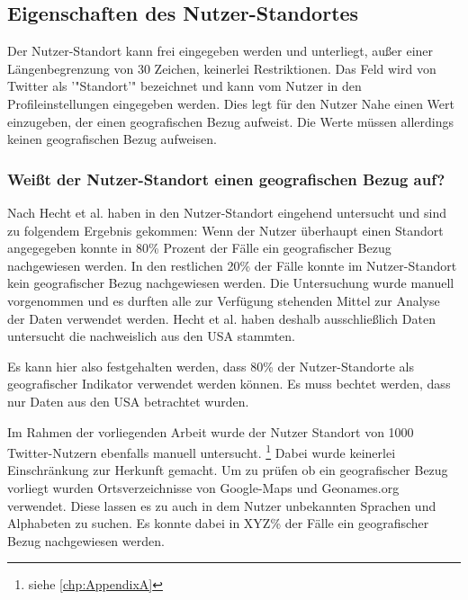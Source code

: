 			\subsection{Eigenschaften des Nutzer-Standortes} 

				Der Nutzer-Standort kann frei eingegeben werden und unterliegt, außer einer Längenbegrenzung von 30 Zeichen, keinerlei Restriktionen. 
				Das Feld wird von Twitter als '"Standort'" bezeichnet und kann vom Nutzer in den Profileinstellungen eingegeben werden. 
				Dies legt für den Nutzer Nahe einen Wert einzugeben, der einen geografischen Bezug aufweist.
				Die Werte müssen allerdings keinen geografischen Bezug aufweisen.

				\subsubsection{Weißt der Nutzer-Standort einen geografischen Bezug auf?} 
					
					Nach Hecht et al. haben in \cite{Hecht2011} den Nutzer-Standort eingehend untersucht und sind zu folgendem Ergebnis gekommen:
					Wenn der Nutzer überhaupt einen Standort angegegeben konnte in 80\% Prozent der Fälle ein geografischer Bezug nachgewiesen werden.
					In den restlichen 20\% der Fälle konnte im Nutzer-Standort kein geografischer Bezug nachgewiesen werden. 
					Die Untersuchung wurde manuell vorgenommen und es durften alle zur Verfügung stehenden Mittel zur Analyse der Daten verwendet werden. 
					Hecht et al. haben deshalb ausschließlich Daten untersucht die nachweislich aus den USA stammten. 

					Es kann hier also festgehalten werden, dass 80\% der Nutzer-Standorte als geografischer Indikator verwendet werden können.
					Es muss bechtet werden, dass nur Daten aus den USA betrachtet wurden.

					Im Rahmen der vorliegenden Arbeit wurde der Nutzer Standort von 1000 Twitter-Nutzern ebenfalls manuell untersucht. \footnote{siehe \ref{chp:AppendixA} }  
					Dabei wurde keinerlei Einschränkung zur Herkunft gemacht.
					Um zu prüfen ob ein geografischer Bezug vorliegt wurden Ortsverzeichnisse von Google-Maps und Geonames.org verwendet.
					Diese lassen es zu auch in dem Nutzer unbekannten Sprachen und Alphabeten zu suchen.
					Es konnte dabei in XYZ\% der Fälle ein geografischer Bezug nachgewiesen werden. 

